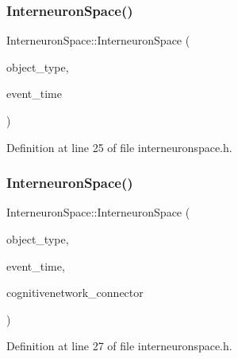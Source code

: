 \subsubsection{\texorpdfstring{Interneuron\+Space()}{InterneuronSpace()}\hspace{0.1cm}{\footnotesize\ttfamily [3/4]}}
{\footnotesize\ttfamily Interneuron\+Space\+::\+Interneuron\+Space (\begin{DoxyParamCaption}\item[{unsigned int}]{object\+\_\+type,  }\item[{std\+::chrono\+::time\+\_\+point$<$ \mbox{\hyperlink{universe_8h_a0ef8d951d1ca5ab3cfaf7ab4c7a6fd80}{Clock}} $>$}]{event\+\_\+time }\end{DoxyParamCaption})\hspace{0.3cm}{\ttfamily [inline]}}



Definition at line 25 of file interneuronspace.\+h.

\mbox{\label{class_interneuron_space_aa87eb8c7186542989fccdadc594c5915}} 
\subsubsection{\texorpdfstring{Interneuron\+Space()}{InterneuronSpace()}\hspace{0.1cm}{\footnotesize\ttfamily [4/4]}}
{\footnotesize\ttfamily Interneuron\+Space\+::\+Interneuron\+Space (\begin{DoxyParamCaption}\item[{unsigned int}]{object\+\_\+type,  }\item[{std\+::chrono\+::time\+\_\+point$<$ \mbox{\hyperlink{universe_8h_a0ef8d951d1ca5ab3cfaf7ab4c7a6fd80}{Clock}} $>$}]{event\+\_\+time,  }\item[{\mbox{\hyperlink{class_cognitive_network}{Cognitive\+Network}} \&}]{cognitivenetwork\+\_\+connector }\end{DoxyParamCaption})\hspace{0.3cm}{\ttfamily [inline]}}



Definition at line 27 of file interneuronspace.\+h.

